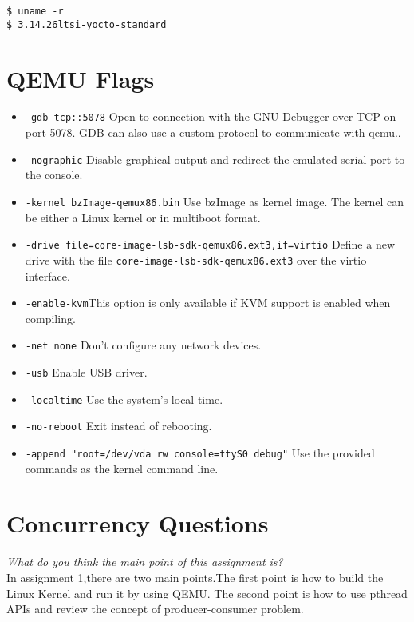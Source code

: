 \documentclass[10pt,conference,draftclsnofoot,onecolumn]{IEEEtran}
\begin{document}
\begin{lstlisting}
$ uname -r
$ 3.14.26ltsi-yocto-standard
\end{lstlisting}


\section{QEMU Flags}

\begin{itemize}
 \item \texttt{-gdb tcp::5078} Open to connection with the GNU Debugger over TCP on port 5078. GDB can also use a custom protocol to communicate with qemu..
\item \texttt{-nographic} Disable graphical output and redirect the emulated serial port to the console.
\item \texttt{-kernel bzImage-qemux86.bin} Use bzImage as kernel image. The kernel can be either a Linux kernel or in multiboot format.
\item \texttt{-drive file=core-image-lsb-sdk-qemux86.ext3,if=virtio} Define a new drive with the file \texttt{core-image-lsb-sdk-qemux86.ext3} over the virtio interface.
\item \texttt{-enable-kvm}This option is only available if KVM support is enabled when compiling.
\item \texttt{-net none} Don't configure any network devices.
\item \texttt{-usb} Enable USB driver.
\item \texttt{-localtime} Use the system's local time.
\item \texttt{-no-reboot} Exit instead of rebooting.
\item \texttt{-append "root=/dev/vda rw console=ttyS0 debug"} Use the provided commands as the kernel command line.

\end{itemize}

\newpage

\section{Concurrency Questions}

\textit{What do you think the main point of this assignment is?}\\

In assignment 1,there are two main points.The first point is how to build the Linux Kernel and run it by using QEMU. The second point is how to use pthread APIs and review the concept of producer-consumer problem. \\
\end{document}
